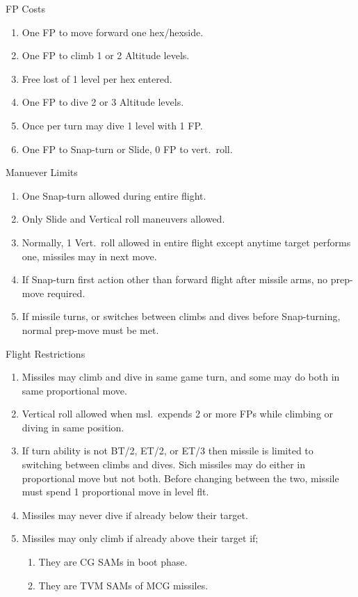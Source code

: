 \begin{table}
\centering
\caption{Missile Flight Rules}
\medskip
\begin{minipage}{\linewidth}

FP Costs
\medskip

\begin{enumerate}
    \item One FP to move forward one hex/hexside.
    \item One FP to climb 1 or 2 Altitude levels.
    \item Free lost of 1 level per hex entered.
    \item One FP to dive 2 or 3 Altitude levels.
    \item Once per turn may dive 1 level with 1 FP.
    \item One FP to Snap-turn or Slide, 0 FP to vert.\ roll.
\end{enumerate}

\medskip
Manuever Limits
\medskip

\begin{enumerate}
    \item One Snap-turn allowed during entire flight.
    \item Only Slide and Vertical roll maneuvers allowed.
    \item Normally, 1 Vert.\ roll allowed in entire flight except anytime target performs one, missiles may in next move.
    \item If Snap-turn first action other than forward flight after missile arms, no prep-move required.
    \item If missile turns, or switches between climbs and dives before Snap-turning, normal prep-move must be met.
\end{enumerate}

\medskip
Flight Restrictions
\medskip

\begin{enumerate}
    \item Missiles may climb and dive in same game turn, and some may do both in same proportional move.
    \item Vertical roll allowed when msl.\ expends 2 or more FPs while climbing or diving in same position.
    \item If turn ability is not BT/2, ET/2, or ET/3 then missile is limited to switching between climbs and dives. Sich missiles may do either in proportional move but not both. Before changing between the two, missile must spend 1 proportional move in level flt.
    \item Missiles may never dive if already below their target.
    \item Missiles may only climb if already above their target if;
    \begin{enumerate}
        \item They are CG SAMs in boot phase.
        \item They are TVM SAMs of MCG missiles.
    \end{enumerate}
\end{enumerate}


\end{minipage}
\end{table}
